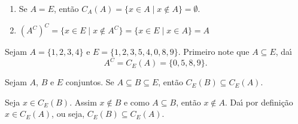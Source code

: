 \begin{observacoes}
	\begin{enumerate}[label={\arabic*})]
		\item Se $A = E$, ent{\~a}o $C_A(A) = \{ x \in A \mid x \notin A \} = \emptyset$.
		\item $(A^C)^C = \{x \in E \mid x \notin A^C\} = \{ x \in E \mid x \in A \} = A$
	\end{enumerate}

\end{observacoes}

\begin{exemplo}
	Sejam $A = \{1,2,3,4\}$ e $E = \{1,2,3,5,4,0,8,9\}$. Primeiro note que $A \subseteq E$, da{\'\i}
	\[
			A^C = C_E(A) = \{0,5,8,9\}.
	\]
\end{exemplo}

\begin{proposicao}
	Sejam $A$, $B$ e $E$ conjuntos. Se $A\subseteq B\subseteq E$, ent{\~a}o $C_E(B)\subseteq C_E(A)$.
\end{proposicao}
\begin{prova}
	Seja $x \in C_E(B)$. Assim $x\notin B$ e como $A \subseteq B$, ent\~ao $x \notin A$. Da{\'\i} por defini\c{c}\~ao $x\in C_E(A)$, ou seja, $C_E(B) \subseteq C_E(A)$.
\end{prova}

